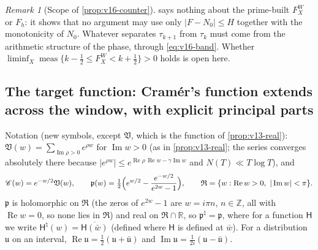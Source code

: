 \documentclass[11pt,a4paper]{article}
\numberwithin{equation}{section}
\theoremstyle{definition}
\theoremstyle{remark}
\newtheorem{remark}[theorem]{Remark}
\newcommand{\meas}{\operatorname{meas}}
\begin{document}
\begin{remark}[Scope of \cref{prop:v16-counter}]\label{rem:v16-scope}
 says nothing about the prime-built $F_X^W$ or $F_h$: it shows that no argument may use only $|F-N_0|\le H$ together with the monotonicity of $N_0$. Whatever separates $\tau_{k+1}$ from $\tau_k$ must come from the arithmetic structure of the phase, through \eqref{eq:v16-band}. Whether $\liminf_{X}\meas\{k-\frac12\le F_X^W<k+\frac12\}>0$ holds is open here.
\end{remark}

\subsection{The target function: Cram\'er's function extends across the window, with explicit principal parts}\label{sec:v17-target}
Notation (new symbols, except $\mathfrak V$, which is the function of \cref{prop:v13-real}): $\mathfrak V(w)=\sum_{\operatorname{Im}\rho>0}e^{\rho w}$ for $\operatorname{Im}w>0$ (as in \cref{prop:v13-real}; the series converges absolutely there because $|e^{\rho w}|\le e^{\operatorname{Re}\rho\,\operatorname{Re}w-\gamma\operatorname{Im}w}$ and $N(T)\ll T\log T$), and
\begin{equation}
\mathscr C(w)=e^{-w/2}\mathfrak V(w),\qquad
\mathfrak p(w)=\tfrac12\Bigl(e^{w/2}-\frac{e^{-w/2}}{e^{2w}-1}\Bigr),\qquad
\mathfrak R=\{w:\operatorname{Re}w>0,\ |\operatorname{Im}w|<\pi\}.
\end{equation}
$\mathfrak p$ is holomorphic on $\mathfrak R$ (the zeros of $e^{2w}-1$ are $w=i\pi n$, $n\in\mathbb Z$, all with $\operatorname{Re}w=0$, so none lies in $\mathfrak R$) and real on $\mathfrak R\cap\mathbb R$, so $\mathfrak p^\natural=\mathfrak p$, where for a function $\mathsf H$ we write $\mathsf H^\natural(w)=\overline{\mathsf H(\bar w)}$ (defined where $\mathsf H$ is defined at $\bar w$). For a distribution $\mathfrak u$ on an interval, $\operatorname{Re}\mathfrak u=\frac12(\mathfrak u+\bar{\mathfrak u})$ and $\operatorname{Im}\mathfrak u=\frac1{2i}(\mathfrak u-\bar{\mathfrak u})$.
\end{document}
